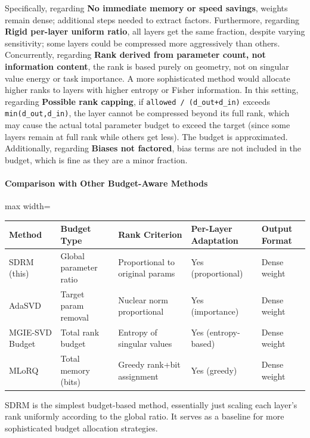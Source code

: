 Specifically, regarding \textbf{No immediate memory or speed savings}, weights remain dense; additional steps needed to extract factors. Furthermore, regarding \textbf{Rigid per-layer uniform ratio}, all layers get the same fraction, despite varying sensitivity; some layers could be compressed more aggressively than others. Concurrently, regarding \textbf{Rank derived from parameter count, not information content}, the rank is based purely on geometry, not on singular value energy or task importance. A more sophisticated method would allocate higher ranks to layers with higher entropy or Fisher information. In this setting, regarding \textbf{Possible rank capping}, if \texttt{allowed / (d\_out+d\_in)} exceeds \texttt{min(d\_out,d\_in)}, the layer cannot be compressed beyond its full rank, which may cause the actual total parameter budget to exceed the target (since some layers remain at full rank while others get less). The budget is approximated. Additionally, regarding \textbf{Biases not factored}, bias terms are not included in the budget, which is fine as they are a minor fraction.


\paragraph{Comparison with Other Budget-Aware Methods}

\begin{center}
\begin{adjustbox}{max width=\columnwidth}
\renewcommand{\arraystretch}{1.2}
\begin{tabular}{lllll}
\toprule
Method & Budget Type & Rank Criterion & Per-Layer Adaptation & Output Format \\
\midrule
SDRM (this) & Global parameter ratio & Proportional to original params & Yes (proportional) & Dense weight \\
AdaSVD & Target param removal & Nuclear norm proportional & Yes (importance) & Dense weight \\
MGIE-SVD Budget & Total rank budget & Entropy of singular values & Yes (entropy-based) & Dense weight \\
MLoRQ & Total memory (bits) & Greedy rank+bit assignment & Yes (greedy) & Dense weight \\

\bottomrule
\end{tabular}
\end{adjustbox}
\end{center}
SDRM is the simplest budget-based method, essentially just scaling each layer's rank uniformly according to the global ratio. It serves as a baseline for more sophisticated budget allocation strategies.


